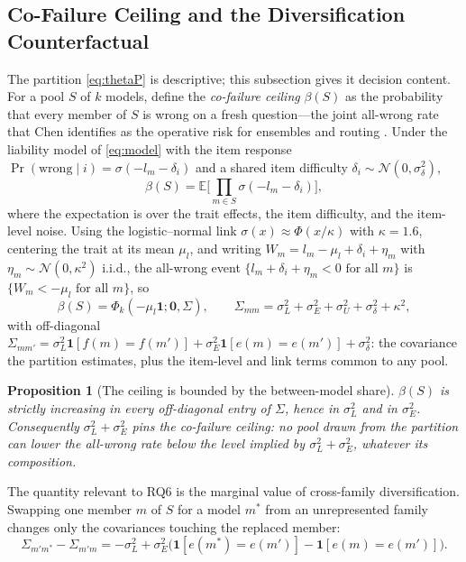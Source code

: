 \documentclass{ieeeaccess}
\theoremstyle{definition}
\theoremstyle{plain}
\newtheorem{proposition}{Proposition}
\begin{document}
\subsection{Co-Failure Ceiling and the Diversification Counterfactual}
\label{sec:cofailure}
The partition \eqref{eq:thetaP} is descriptive; this subsection gives it
decision content. For a pool $S$ of $k$ models, define the \emph{co-failure
ceiling} $\beta(S)$ as the probability that every member of $S$ is wrong on a
fresh question---the joint all-wrong rate that Chen identifies as the operative
risk for ensembles and routing \cite{chen2026}. Under the liability model of
\eqref{eq:model} with the item response
$\Pr(\text{wrong}\mid i)=\sigma(-l_{m}-\delta_{i})$ and a shared item difficulty
$\delta_{i}\sim\mathcal{N}(0,\sigma^{2}_{\delta})$,
\begin{equation}
\beta(S)=\mathbb{E}\Big[\prod_{m\in S}\sigma(-l_{m}-\delta_{i})\Big],
\label{eq:beta}
\end{equation}
where the expectation is over the trait effects, the item difficulty, and the
item-level noise. Using the logistic--normal link
$\sigma(x)\approx\Phi(x/\kappa)$ with $\kappa=1.6$, centering the trait at its
mean $\mu_{l}$, and writing $W_{m}=l_{m}-\mu_{l}+\delta_{i}+\eta_{m}$ with
$\eta_{m}\sim\mathcal{N}(0,\kappa^{2})$ i.i.d., the all-wrong event
$\{l_{m}+\delta_{i}+\eta_{m}<0\text{ for all }m\}$ is
$\{W_{m}<-\mu_{l}\text{ for all }m\}$, so
\begin{equation}
\beta(S)=\Phi_{k}(-\mu_{l}\mathbf{1};\mathbf{0},\Sigma),
\qquad
\Sigma_{mm}=\sigma^{2}_{L}+\sigma^{2}_{E}+\sigma^{2}_{U}
+\sigma^{2}_{\delta}+\kappa^{2},
\label{eq:betaOrthant}
\end{equation}
with off-diagonal
$\Sigma_{mm'}=\sigma^{2}_{L}\mathbf{1}[f(m){=}f(m')]
+\sigma^{2}_{E}\mathbf{1}[e(m){=}e(m')]+\sigma^{2}_{\delta}$:
the covariance the partition estimates, plus the item-level and link terms
common to any pool.

\begin{proposition}[The ceiling is bounded by the between-model share]
\label{prop:ceiling}
$\beta(S)$ is strictly increasing in every off-diagonal entry of $\Sigma$, hence
in $\sigma^{2}_{L}$ and in $\sigma^{2}_{E}$. Consequently
$\sigma^{2}_{L}+\sigma^{2}_{E}$ pins the co-failure ceiling: no pool drawn from
the partition can lower the all-wrong rate below the level implied by
$\sigma^{2}_{L}+\sigma^{2}_{E}$, whatever its composition.
\end{proposition}

The quantity relevant to RQ6 is the marginal value of cross-family
diversification. Swapping one member $m$ of $S$ for a model $m^{*}$ from an
unrepresented family changes only the covariances touching the replaced member:
\begin{equation}
\Sigma_{m'm^{*}}-\Sigma_{m'm}
=-\sigma^{2}_{L}
+\sigma^{2}_{E}\big(\mathbf{1}[e(m^{*}){=}e(m')]
-\mathbf{1}[e(m){=}e(m')]\big).
\label{eq:swap}
\end{equation}
\end{document}
